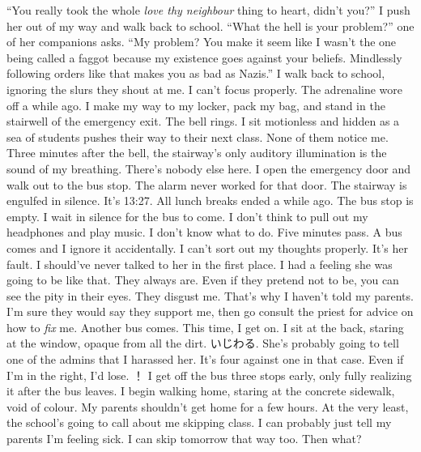 \documentclass[a4paper, 12pt]{book}
\begin{document}
\begin{CJK*}{UTF8}{min}
\newline
\tab
``You really took the whole \textit{love thy neighbour} thing to heart, didn’t you?'' I push her out of my way and walk back to school. 
\newline
\tab
``What the hell is your problem?'' one of her companions asks.
\newline
\tab
``My problem? You make it seem like I wasn’t the one being called a faggot because my existence goes against your beliefs. Mindlessly following orders like that makes you as bad as Nazis.'' I walk back to school, ignoring the slurs they shout at me. I can’t focus properly. The adrenaline wore off a while ago. I make my way to my locker, pack my bag, and stand in the stairwell of the emergency exit. The bell rings. I sit motionless and hidden as a sea of students pushes their way to their next class. None of them notice me. Three minutes after the bell, the stairway’s only auditory illumination is the sound of my breathing. There’s nobody else here. I open the emergency door and walk out to the bus stop. The alarm never worked for that door. The stairway is engulfed in silence. It’s 13:27. All lunch breaks ended a while ago. The bus stop is empty. I wait in silence for the bus to come. I don’t think to pull out my headphones and play music. I don’t know what to do.
\newline
\tab
Five minutes pass. A bus comes and I ignore it accidentally. I can’t sort out my thoughts properly. It’s her fault. I should’ve never talked to her in the first place. I had a feeling she was going to be like that. They always are. Even if they pretend not to be, you can see the pity in their eyes. They disgust me. That’s why I haven’t told my parents. I’m sure they would say they support me, then go consult the priest for advice on how to \textit{fix} me. 
\newline
\tab
Another bus comes. This time, I get on. I sit at the back, staring at the window, opaque from all the dirt. いじわる. She’s probably going to tell one of the admins that I harassed her. It’s four against one in that case. Even if I’m in the right, I’d lose. ！
\newline
\tab
I get off the bus three stops early, only fully realizing it after the bus leaves. I begin walking home, staring at the concrete sidewalk, void of colour. My parents shouldn’t get home for a few hours. At the very least, the school’s going to call about me skipping class. I can probably just tell my parents I’m feeling sick. I can skip tomorrow that way too. Then what?

\end{CJK*}
\end{document}
